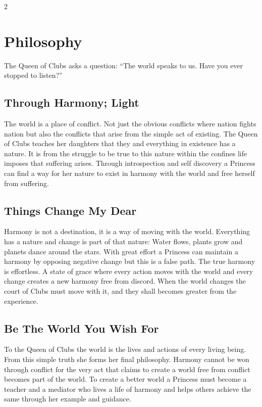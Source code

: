 \begin{multicols}{2}
\section*{Philosophy}
The Queen of Clubs asks a question: \textquotedblleft The world speaks to us. Have you ever stopped to listen?\textquotedblright

\subsection*{Through Harmony; Light}

The world is a place of conflict. Not just the obvious conflicts where nation fights nation but also the conflicts that arise from the simple act of existing. The Queen of Clubs teaches her daughters that they and everything in existence has a nature. It is from the struggle to be true to this nature within the confines life imposes that suffering arises. Through introspection and self discovery a Princess can find a way for her nature to exist in harmony with the world and free herself from suffering.

\subsection*{Things Change My Dear}

Harmony is not a destination, it is a way of moving with the world. Everything has a nature and change is part of that nature: Water flows, plants grow and planets dance around the stars. With great effort a Princess can maintain a harmony by opposing negative change but this is a false path. The true harmony is effortless. A state of grace where every action moves with the world and every change creates a new harmony free from discord. When the world changes the court of Clubs must move with it, and they shall becomes greater from the experience.

\subsection*{Be The World You Wish For}

To the Queen of Clubs the world is the lives and actions of every living being. From this simple truth she forms her final philosophy. Harmony cannot be won through conflict for the very act that claims to create a world free from conflict becomes part of the world. To create a better world a Princess must become a teacher and a mediator who lives a life of harmony and helps others achieve the same through her example and guidance. 


\end{multicols}
